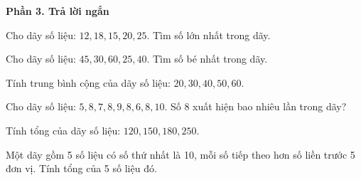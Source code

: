 \textbf{Phần 3. Trả lời ngắn}

\begin{ex} %
Cho dãy số liệu: $12, 18, 15, 20, 25$. Tìm số lớn nhất trong dãy.
\end{ex}

\begin{ex} %
Cho dãy số liệu: $45, 30, 60, 25, 40$. Tìm số bé nhất trong dãy.
\end{ex}

\begin{ex} %
Tính trung bình cộng của dãy số liệu: $20, 30, 40, 50, 60$.
\end{ex}

\begin{ex} %
Cho dãy số liệu: $5, 8, 7, 8, 9, 8, 6, 8, 10$. Số 8 xuất hiện bao nhiêu lần trong dãy?
\end{ex}

\begin{ex} %
Tính tổng của dãy số liệu: $120, 150, 180, 250$.
\end{ex}

\begin{ex} %
Một dãy gồm 5 số liệu có số thứ nhất là 10, mỗi số tiếp theo hơn số liền trước 5 đơn vị. Tính tổng của 5 số liệu đó.
\end{ex}

